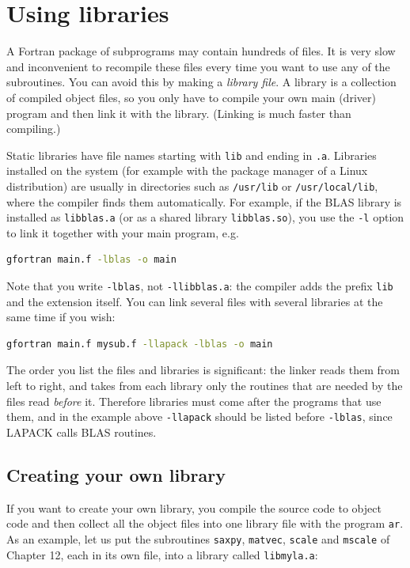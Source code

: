 \section{Using libraries}

A Fortran package of subprograms may contain hundreds of files. It is very slow and inconvenient to recompile these files every time you want to use any of the subroutines. You can avoid this by making a \emph{library file}. A library is a collection of compiled object files, so you only have to compile your own main (driver) program and then link it with the library. (Linking is much faster than compiling.)

Static libraries have file names starting with \texttt{lib} and ending in \texttt{.a}. Libraries installed on the system (for example with the package manager of a Linux distribution) are usually in directories such as \texttt{/usr/lib} or \texttt{/usr/local/lib}, where the compiler finds them automatically. For example, if the BLAS library is installed as \texttt{libblas.a} (or as a shared library \texttt{libblas.so}), you use the \texttt{-l} option to link it together with your main program, e.g.

\begin{lstlisting}[language=bash]
gfortran main.f -lblas -o main
\end{lstlisting}

Note that you write \texttt{-lblas}, not \texttt{-llibblas.a}: the compiler adds the prefix \texttt{lib} and the extension itself. You can link several files with several libraries at the same time if you wish:

\begin{lstlisting}[language=bash]
gfortran main.f mysub.f -llapack -lblas -o main
\end{lstlisting}

The order you list the files and libraries is significant: the linker reads them from left to right, and takes from each library only the routines that are needed by the files read \emph{before} it. Therefore libraries must come after the programs that use them, and in the example above \texttt{-llapack} should be listed before \texttt{-lblas}, since LAPACK calls BLAS routines.

\subsection{Creating your own library}

If you want to create your own library, you compile the source code to object code and then collect all the object files into one library file with the program \texttt{ar}. As an example, let us put the subroutines \texttt{saxpy}, \texttt{matvec}, \texttt{scale} and \texttt{mscale} of Chapter 12, each in its own file, into a library called \texttt{libmyla.a}:

